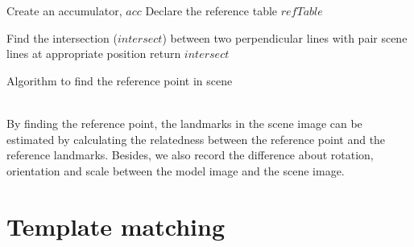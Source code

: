 \begin{algorithm}[H]
\Indm 
{}
\SetAlgoLined
{}
\Indp
Create an accumulator, $acc$\;
Declare the reference table $refTable$ \;

Find the intersection ($intersect$) between two perpendicular lines with pair scene lines at appropriate position\;
return $intersect$ \;
\caption{Algorithm to find the reference point in scene}
\end{algorithm}~\\[0.2cm]
By finding the reference point, the landmarks in the scene image can be estimated by calculating the relatedness between the reference point and the reference landmarks. Besides, we also record the difference about rotation, orientation and scale between the model image and the scene image.
\section{Template matching}
